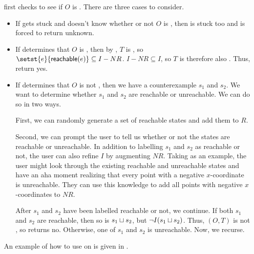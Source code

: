 \Helper{} first checks to see if $O$ is . There are three
cases to consider.
\begin{itemize}
  \item
    If \IsIclosed{} gets stuck and doesn't know whether or not $O$ is
    , then \Helper{} is stuck too and is forced to return
    unknown.
  \item
    If \IsIclosed{} determines that $O$ is , then by
    , $T$ is , so
    $\setst{e}{\reachable{e}} \subseteq I - NR$. $I - NR \subseteq I$, so $T$
    is therefore also \Iconfluent{}. Thus, \Helper{} return yes.
  \item
    If \IsIclosed{} determines that $O$ is not , then we
    have a counterexample $s_1$ and $s_2$. We want to determine whether $s_1$
    and $s_2$ are reachable or unreachable. We can do so in two ways.

    First, we can randomly generate a set of reachable states and add them to
    $R$.

    Second, we can prompt the user to tell us whether or not the states are
    reachable or unreachable. In addition to labelling $s_1$ and $s_2$ as
    reachable or not, the user can also refine $I$ by augmenting $NR$. Taking
     as an example, the user might look
    through the existing reachable and unreachable states and have an aha
    moment realizing that every point with a negative $x$-coordinate is
    unreachable. They can use this knowledge to add all points with negative
    $x$-coordinates to $NR$.

    After $s_1$ and $s_2$ have been labelled reachable or not, we continue. If
    both $s_1$ and $s_2$ are reachable, then so is $s_1 \sqcup s_2$, but $\lnot
    I(s_1 \sqcup s_2)$. Thus, $(O, T)$ is not \Iconfluent{}, so \Helper{}
    returns no.  Otherwise, one of $s_1$ and $s_2$ is unreachable. Now, we
    recurse.
\end{itemize}


An example of how to use  on
 is given in
.



